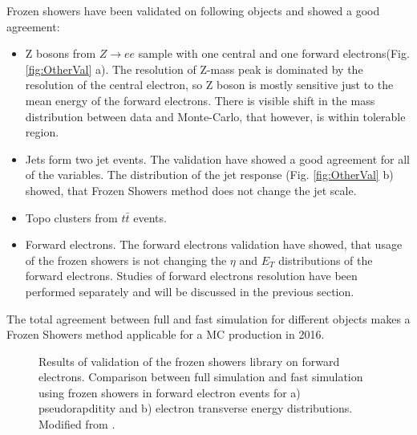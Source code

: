 Frozen showers have been validated on following objects and showed a good agreement:
\begin{itemize}
\item Z bosons from $Z \to ee$ sample with one central and one forward electrons(Fig. \ref{fig:OtherVal} a). The resolution of Z-mass peak is dominated by the resolution of the central electron, so Z boson is mostly sensitive just to the mean energy of the forward electrons. There is visible shift in the mass distribution between data and Monte-Carlo, that however, is within tolerable region.
\item Jets form two jet events. The validation have showed a good agreement for all of the variables. The distribution of the jet response (Fig. \ref{fig:OtherVal} b) showed, that Frozen Showers method does not change the jet scale.
\item Topo clusters from $t\bar{t}$ events. 
\item Forward electrons. The forward electrons validation have showed, that usage of the frozen showers is not changing the $\eta$ and $E_{T}$ distributions of the forward electrons. Studies of forward electrons resolution have been performed separately and will be discussed in the previous section.
\end{itemize}
The total agreement between full and fast simulation for different objects makes a Frozen Showers method applicable for a MC production in 2016.

\begin{figure}[!tbp]
\begin{minipage}[h]{0.49\linewidth}
\end{minipage}
\hfill
\begin{minipage}[h]{0.49\linewidth}
\end{minipage}
\caption{Results of validation of the frozen showers library on forward electrons. Comparison between full simulation and fast simulation using frozen showers in forward electron events  for a) pseudorapditity and b) electron transverse energy  distributions. Modified from \cite{ElecForwardVal}. }
\label{fig:OtherValFwd}
\end{figure}

